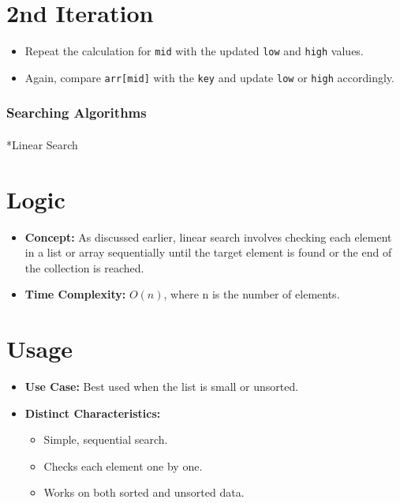 \documentclass[
  letterpaper,
  DIV=11,
  numbers=noendperiod]{scrreprt}
\makeatletter
\let\oldparagraph\paragraph
\renewcommand{\paragraph}{
    \@ifstar
      \xxxParagraphStar
      \xxxParagraphNoStar
  }
\newcommand{\xxxParagraphStar}[1]{\oldparagraph*{#1}\mbox{}}
\newcommand{\xxxParagraphNoStar}[1]{\oldparagraph{#1}\mbox{}}
\providecommand{\tightlist}{%
  \setlength{\itemsep}{0pt}\setlength{\parskip}{0pt}}
\makeatother
\begin{document}
\section{2nd Iteration}

\begin{itemize}
\tightlist
\item
  Repeat the calculation for \texttt{mid} with the updated \texttt{low}
  and \texttt{high} values.
\item
  Again, compare \texttt{arr{[}mid{]}} with the \texttt{key} and update
  \texttt{low} or \texttt{high} accordingly.
\end{itemize}

\subsubsection*{Searching Algorithms}\label{searching-algorithms}

\paragraph*{Linear Search}\label{linear-search-1}

\section{Logic}

\begin{itemize}
\tightlist
\item
  \textbf{Concept:} As discussed earlier, linear search involves
  checking each element in a list or array sequentially until the target
  element is found or the end of the collection is reached.
\item
  \textbf{Time Complexity:} \(O(n)\), where n is the number of elements.
\end{itemize}

\section{Usage}

\begin{itemize}
\item
  \textbf{Use Case:} Best used when the list is small or unsorted.
\item
  \textbf{Distinct Characteristics:}

  \begin{itemize}
  \tightlist
  \item
    Simple, sequential search.
  \item
    Checks each element one by one.
  \item
    Works on both sorted and unsorted data.
  \end{itemize}
\end{itemize}
\end{document}
